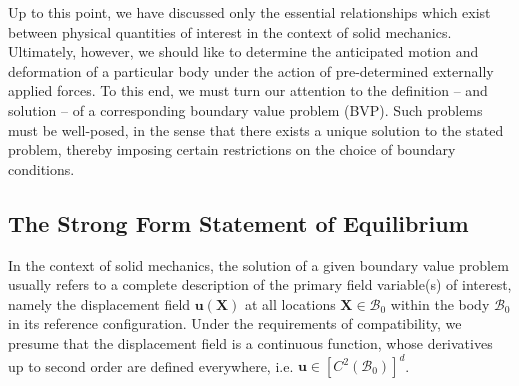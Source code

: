 Up to this point, we have discussed only the essential relationships which exist between physical quantities of interest in the context of solid mechanics. Ultimately, however, we should like to determine the anticipated motion and deformation of a particular body under the action of pre-determined externally applied forces. To this end, we must turn our attention to the definition -- and solution -- of a corresponding boundary value problem (BVP). Such problems must be well-posed, in the sense that there exists a unique solution to the stated problem, thereby imposing certain restrictions on the choice of boundary conditions.

\subsection{The Strong Form Statement of Equilibrium}

In the context of solid mechanics, the solution of a given boundary value problem usually refers to a complete description of the primary field variable(s) of interest, namely the displacement field $\mathbf{u} (\mathbf{X})$ at all locations $\mathbf{X} \in \mathcal{B}_0$ within the body $\mathcal{B}_0$ in its reference configuration. Under the requirements of compatibility, we presume that the displacement field is a continuous function, whose derivatives up to second order are defined everywhere, i.e. $\mathbf{u} \in \left[ C^2 (\mathcal{B}_0) \right]^d$.

